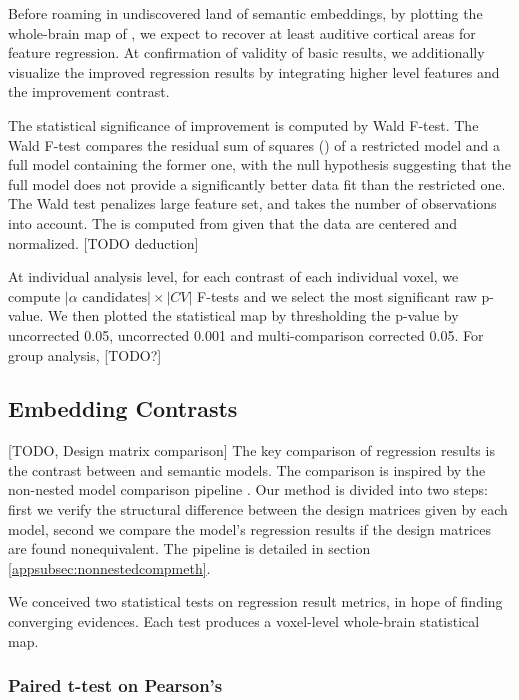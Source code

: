 Before roaming in undiscovered land of semantic embeddings, by plotting the whole-brain map of , we expect to recover at least auditive cortical areas for  feature regression. At confirmation of validity of basic results, we additionally visualize the improved regression results by integrating higher level features and the improvement contrast. 

The statistical significance of improvement is computed by Wald F-test. The Wald F-test compares the residual sum of squares () of a restricted model and a full model containing the former one, with the null hypothesis suggesting that the full model does not provide a significantly better data fit than the restricted one. The Wald test penalizes large feature set, and takes the number of observations into account. The  is computed from  given that the data are centered and normalized. [TODO deduction]

At individual analysis level, for each contrast of each individual voxel, we compute \( \lvert \alpha \text{ candidates} \rvert \times \lvert CV \rvert \) F-tests and we select the most significant raw p-value. We then plotted the statistical map by thresholding the p-value by uncorrected 0.05, uncorrected 0.001 and multi-comparison corrected 0.05. For group analysis, [TODO?]

\subsection{Embedding Contrasts}
[TODO, Design matrix comparison]
The key comparison of regression results is the contrast between  and  semantic models. The comparison is inspired by the non-nested model comparison pipeline \parencite{merkleTestingNonnestedStructural2016}. Our method is divided into two steps: first we verify the structural difference between the design matrices given by each model, second we compare the model's regression results if the design matrices are found nonequivalent. The pipeline is detailed in section \ref{appsubsec:nonnestedcompmeth}.

We conceived two statistical tests on regression result metrics, in hope of finding converging evidences. Each test produces a voxel-level whole-brain statistical map.

\subsubsection{Paired t-test on Pearson's }

